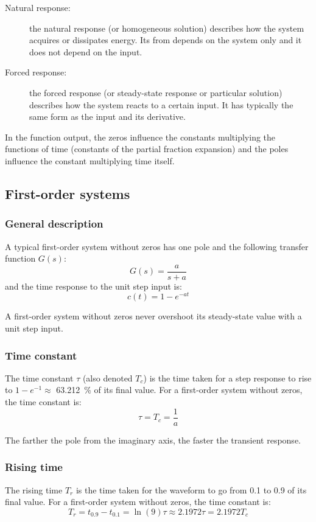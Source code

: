 \documentclass[10pt, twocolumn]{article}
\begin{document}
\begin{description}
  \item[Natural response:] the natural response (or homogeneous solution) describes how the system acquires or dissipates energy.
        Its from depends on the system only and it does not depend on the input.
  \item[Forced response:] the forced response (or steady-state response or particular solution) describes how the system reacts to a certain input.
        It has typically the same form as the input and its derivative.
\end{description}

In the function output, the zeros influence the constants multiplying the functions of time (constants of the partial fraction expansion) and the poles influence the constant multiplying time itself.


\subsection{First-order systems}
\subsubsection{General description}
A typical first-order system without zeros has one pole and the following transfer function \(G(s)\):
\[
  G(s) = \frac{a}{s + a}
\]
and the time response to the unit step input is:
\[
  c(t) = 1 - e^{-at}
\]

\begin{remark}
  A first-order system without zeros never overshoot its steady-state value with a unit step input.
\end{remark}


\subsubsection{Time constant}
The time constant \(\tau\) (also denoted \(T_c\)) is the time taken for a step response to rise to \(1 - e^{-1} \approx\) \SI{63.212}{\percent} of its final value.
For a first-order system without zeros, the time constant is:
\[
  \tau = T_c = \frac{1}{a}
\]

\begin{remark}
  The farther the pole from the imaginary axis, the faster the transient response.
\end{remark}


\subsubsection{Rising time}
The rising time \(T_r\) is the time taken for the waveform to go from 0.1 to 0.9 of its final value.
For a first-order system without zeros, the time constant is:
\[
  T_r = t_{0.9} - t_{0.1} = \ln(9)\tau \approx 2.1972\tau = 2.1972 T_c
\]
\end{document}
